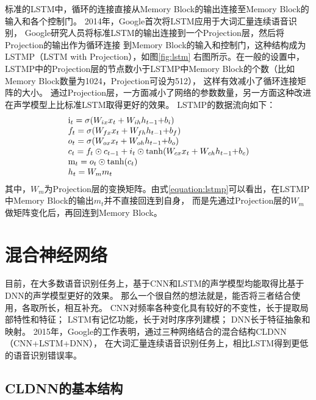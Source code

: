 标准的LSTM中，循环的连接直接从Memory Block的输出连接至Memory Block的输入和各个控制门。
2014年，Google首次将LSTM应用于大词汇量连续语音识别，
Google研究人员将标准LSTM的输出连接到一个Projection层，然后将Projection的输出作为循环连接
到Memory Block的输入和控制门，这种结构成为LSTMP（LSTM with Projection），如图\ref{fig:lstm}
右图所示。在一般的设置中，LSTMP中的Projection层的节点数小于LSTMP中Memory Block的个数（比如Memory Block数量为1024，Projection可设为512），
这样有效减小了循环连接矩阵的大小。
通过Projection层，一方面减小了网络的参数数量，另一方面这种改进在声学模型上比标准LSTM取得更好的效果。
LSTMP的数据流向如下：
\begin{equation}
\label{equation:lstmp}
\begin{array}{l}
{{\rm{i}}_t} = \sigma ({W_{ix}}{x_t} + {W_{ih}}{h_{t - 1}}{\rm{ + }}{b_i})\\
{f_t} = \sigma ({W_{fx}}{x_t} + {W_{fh}}{h_{t - 1}}{\rm{ + }}{b_f})\\
{o_t} = \sigma ({W_{ox}}{x_t} + {W_{oh}}{h_{t - 1}}{\rm{ + }}{b_o})\\
{c_t} = {f_t} \odot {c_{t - 1}} + {i_t} \odot \tanh ({W_{cx}}{x_t} + {W_{ch}}{h_{t - 1}}{\rm{ + }}{b_c})\\
{{\rm{m}}_t} = {o_t} \odot \tanh ({c_t})\\
{h_t} = {W_m}{m_t}
\end{array}
\end{equation}
其中，$W_m$为Projection层的变换矩阵。由式\ref{equation:lstmp}可以看出，在LSTMP中Memory Block的输出$m_t$并不直接回连到自身，
而是先通过Projection层的$W_m$做矩阵变化后，再回连到Memory Block。

\section{混合神经网络}

目前，在大多数语音识别任务上，基于CNN和LSTM的声学模型均能取得比基于DNN的声学模型更好的效果。
那么一个很自然的想法就是，能否将三者结合使用，各取所长，相互补充。
CNN对频率各种变化具有较好的不变性，长于提取局部特性和特征；
LSTM有记忆功能，长于对时序序列建模；
DNN长于特征抽象和映射。
2015年，Google的工作表明，通过三种网络结合的混合结构CLDNN（CNN+LSTM+DNN），
在大词汇量连续语音识别任务上，相比LSTM得到更低的语音识别错误率。

\subsection{CLDNN的基本结构}

